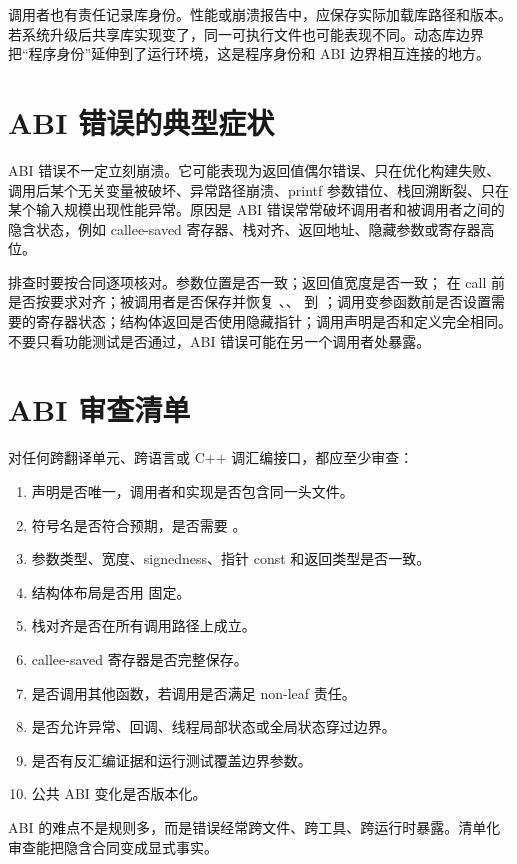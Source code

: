调用者也有责任记录库身份。性能或崩溃报告中，应保存实际加载库路径和版本。若系统升级后共享库实现变了，同一可执行文件也可能表现不同。动态库边界把“程序身份”延伸到了运行环境，这是程序身份和 ABI 边界相互连接的地方。

\section{ABI 错误的典型症状}

ABI 错误不一定立刻崩溃。它可能表现为返回值偶尔错误、只在优化构建失败、调用后某个无关变量被破坏、异常路径崩溃、printf 参数错位、栈回溯断裂、只在某个输入规模出现性能异常。原因是 ABI 错误常常破坏调用者和被调用者之间的隐含状态，例如 callee-saved 寄存器、栈对齐、返回地址、隐藏参数或寄存器高位。

排查时要按合同逐项核对。参数位置是否一致；返回值宽度是否一致； 在 call 前是否按要求对齐；被调用者是否保存并恢复 、、 到 ；调用变参函数前是否设置需要的寄存器状态；结构体返回是否使用隐藏指针；调用声明是否和定义完全相同。不要只看功能测试是否通过，ABI 错误可能在另一个调用者处暴露。

\section{ABI 审查清单}

对任何跨翻译单元、跨语言或 C++ 调汇编接口，都应至少审查：

\begin{enumerate}
  \item 声明是否唯一，调用者和实现是否包含同一头文件。
  \item 符号名是否符合预期，是否需要 。
  \item 参数类型、宽度、signedness、指针 const 和返回类型是否一致。
  \item 结构体布局是否用  固定。
  \item 栈对齐是否在所有调用路径上成立。
  \item callee-saved 寄存器是否完整保存。
  \item 是否调用其他函数，若调用是否满足 non-leaf 责任。
  \item 是否允许异常、回调、线程局部状态或全局状态穿过边界。
  \item 是否有反汇编证据和运行测试覆盖边界参数。
  \item 公共 ABI 变化是否版本化。
\end{enumerate}

ABI 的难点不是规则多，而是错误经常跨文件、跨工具、跨运行时暴露。清单化审查能把隐含合同变成显式事实。

